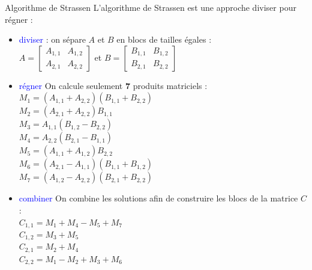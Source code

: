 \documentclass[10pt]{beamer}
\begin{document}
\begin{frame}[fragile]{\Ctitle}{\stitle}
	\begin{exampleblock}{Algorithme de Strassen}
		{\small L'algorithme de Strassen est une approche diviser pour régner :}
		\begin{itemize}
			\item<2->{\small \textcolor{blue}{diviser} : on sépare $A$ et $B$ en blocs de tailles égales : \\
			            $A =
				            \begin{bmatrix}
					            A_{1,1} & A_{1,2} \\
					            A_{2,1} & A_{2,2}
				            \end{bmatrix}$ et
			            $B =
				            \begin{bmatrix}
					            B_{1,1} & B_{1,2} \\
					            B_{2,1} & B_{2,2}
				            \end{bmatrix}$}
			\item<3->{\small \textcolor{blue}{régner} On calcule \textcolor{BrickRed}{seulement \textbf{7}} produits matriciels : \\
			            $M_{1} = (A_{1,1} + A_{2,2}) (B_{1,1} + B_{2,2})$ \\
			            $M_{2} = (A_{2,1} + A_{2,2}) B_{1,1}$\\
			            $M_{3} = A_{1,1} (B_{1,2} - B_{2,2})$\\
			            $M_{4} = A_{2,2} (B_{2,1} - B_{1,1})$\\
			            $M_{5} = (A_{1,1} + A_{1,2}) B_{2,2}$\\
			            $M_{6} = (A_{2,1} - A_{1,1}) (B_{1,1} + B_{1,2})$\\
			            $M_{7} = (A_{1,2} - A_{2,2}) (B_{2,1} + B_{2,2})$}
			\item<4->{\small \textcolor{blue}{combiner} On combine les solutions afin de construire les blocs de la matrice $C$ :\\
			            $C_{1,1} = M_{1} + M_{4} - M_{5} + M_{7}$\\
			            $C_{1,2} = M_{3} + M_{5}$\\
			            $C_{2,1} = M_{2} + M_{4}$\\
			            $C_{2,2} = M_{1} - M_{2} + M_{3} + M_{6}$}
		\end{itemize}
	\end{exampleblock}
\end{frame}
\end{document}

